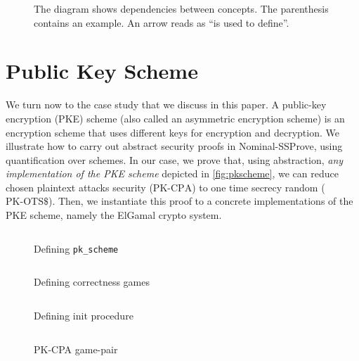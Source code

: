 \documentclass[a4paper,USenglish,cleveref, autoref]{lipics-v2021}
\newcommand{\Adv}{\mathrm{Adv}}
\newcommand{\A}{\mathcal{A}}
\renewcommand{\P}{\mathcal{P}}
\newcommand{\CPA}{\ensuremath{\mathrm{PK\text{-}CPA}}}
\newcommand{\OTSR}{\ensuremath{\mathrm{PK\text{-}OTS\$}}}
\newcommand{\DDH}{\ensuremath{\mathrm{DDH}}}
\newcommand{\RED}{\ensuremath{\mathrm{RED}}}
\newcommand{\NSSP}{Nominal-SSProve\xspace}
\begin{document}
\begin{figure}
\begin{center}
  \caption{The diagram shows dependencies between concepts. The parenthesis contains an example.
           An arrow reads as ``is used to define''.}
  \label{fig:deps}
\end{center}
\end{figure}


\section{Public Key Scheme}\label{sec:pkscheme}

We turn now to the case study that we discuss in  this paper.  A public-key encryption (PKE) scheme (also called an asymmetric encryption scheme) is an encryption scheme that uses different keys for encryption and decryption. We illustrate how to carry out abstract security proofs in \NSSP, using quantification over schemes. In our case, we prove that, using abstraction, \emph{any implementation of the PKE scheme} depicted in \cref{fig:pkscheme}, we can reduce chosen plaintext attacks security (\CPA) to one time secrecy random (\OTSR). Then,  we  instantiate this proof to a concrete implementations of the PKE scheme, namely the ElGamal crypto system. 

\begin{figure}
  \begin{minipage}[t]{0.49\textwidth}
    \inputminted{coq}{snippets/pkscheme.v}
    \caption{Defining \texttt{pk\_scheme}}
    \label{fig:pkscheme}
    \inputminted{coq}{snippets/corr.v}
    \caption{Defining correctness games}
    \label{fig:correct}
  \end{minipage} \hfill \begin{minipage}[t]{0.49\textwidth}
    \inputminted{coq}{snippets/init.v}
    \caption{Defining init procedure}
    \label{fig:init}
    \inputminted{coq}{snippets/pkcpa.v}
    \caption{PK-CPA game-pair}
    \label{fig:pkcpa}
  \end{minipage}
\end{figure}
\end{document}
